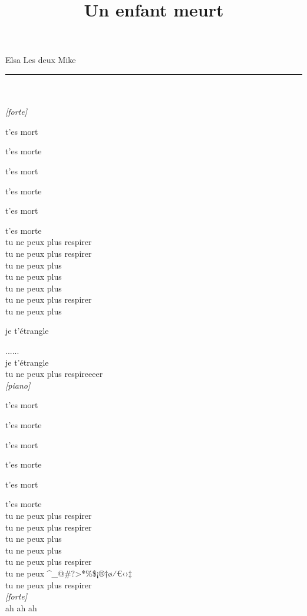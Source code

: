 \documentclass{article}
\title{Un enfant meurt}
\date{}
\begin{document}
\maketitle
Elsa \hfill Les deux \hfill Mike \\\hrule\hfill\\\hfill\\
{ \centering \emph{[forte]} \\}
{ \raggedright t'es mort \\ }
{ \raggedleft t'es morte \\ }
{ \raggedright t'es mort \\ }
\hfill { \raggedleft t'es morte \\ }
{ \raggedright t'es mort \\ }
\hfill { \raggedleft t'es morte \\ }
{ \centering tu ne peux plus respirer\\
tu ne peux plus respirer\\
tu ne peux plus\\
tu ne peux plus\\
tu ne peux plus\\
tu ne peux plus respirer\\
tu ne peux plus\\ }
{ \raggedright je t'étrangle \\ }
{ \centering ...... \\ }
\hfill je t'étrangle\\
{ \centering tu ne peux plus respireeeer\\ }
{ \centering \emph{[piano]} \\}
{ \raggedright t'es mort \\ }
\hfill { \raggedleft t'es morte \\ }
{ \raggedright t'es mort \\ }
\hfill { \raggedleft t'es morte \\ }
{ \raggedright t'es mort \\ }
\hfill { \raggedleft t'es morte \\ }
{ \centering tu ne peux plus respirer \\
tu ne peux plus respirer \\
tu ne peux plus \\
tu ne peux plus \\
tu ne peux plus respirer \\
tu ne peux \textasciicircum \_@\#?>*\%\$¡®†ø⁄€‹›‡\\
tu ne peux plus respirer \\ \pagebreak
{ \centering \emph{[forte]} \\}
ah ah ah \\ }
\end{document}
